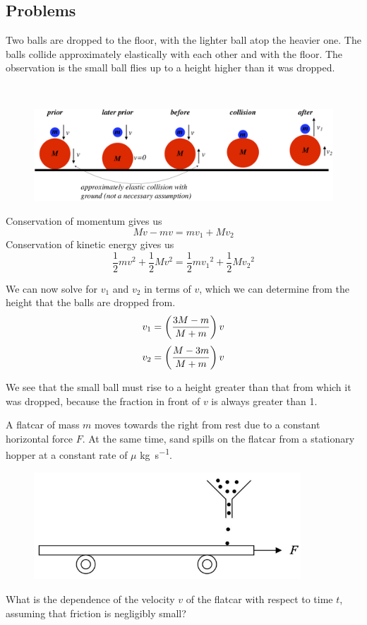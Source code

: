 \subsection{Problems}
\begin{prbm}
Two balls are dropped to the floor, with the lighter ball atop the heavier one. The balls collide approximately elastically with each other and with the floor. The observation is the small ball flies up to a height higher than it was dropped.
\end{prbm}
\begin{solution} \ {\\}
\begin{figure}[H]
    \centering
    \includegraphics[width=15cm]{images/Stacked_balls.png}
\end{figure}

Conservation of momentum gives us 
\[ Mv - mv = mv_1 + Mv_2 \]
Conservation of kinetic energy gives us 
\[ \frac{1}{2}mv^2 + \frac{1}{2}Mv^2 = \frac{1}{2}m{v_1}^2 + \frac{1}{2}M{v_2}^2 \]

We can now solve for $v_1$ and $v_2$ in terms of $v$, which we can determine from the height that the balls are dropped from.
\[ v_1=\left(\frac{3M-m}{M+m}\right)v \]
\[ v_2=\left(\frac{M-3m}{M+m}\right)v \]

We see that the small ball must rise to a height greater than that from which it was dropped, because the fraction in front of $v$ is always greater than 1.
\end{solution}
\pagebreak

\begin{prbm}
A flatcar of mass $m$ moves towards the right from rest due to a constant horizontal force $F$. At the same time, sand spills on the flatcar from a stationary hopper at a constant rate of $\mu$ \unit{kg.s^{-1}}. 

\begin{figure}[H]
    \centering
    \includegraphics[width=10cm]{images/Sand_car.png}
\end{figure}

What is the dependence of the velocity $v$ of the flatcar with respect to time $t$, assuming that friction is negligibly small?
\end{prbm}

